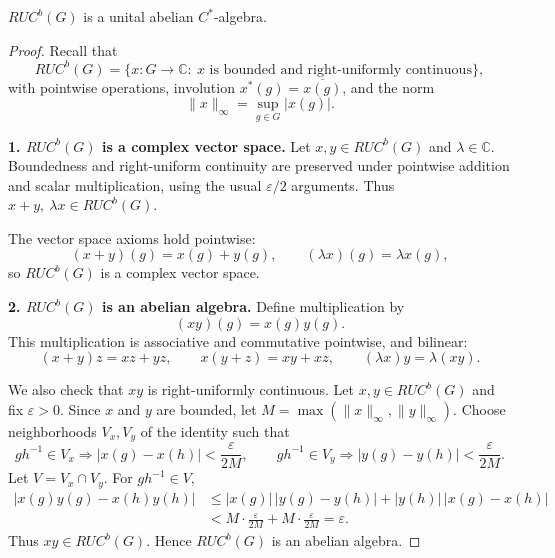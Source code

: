 \begin{mynote}
    \begin{proposition*}
        $RUC^b(G)$ is a unital abelian $C^*$-algebra.
    \end{proposition*}

    \begin{proof}
        Recall that
        \[
            RUC^b(G)=\{x:G\to\mathbb C:\ x \text{ is bounded and right-uniformly continuous}\},
        \]
        with pointwise operations, involution $x^*(g)=\overline{x(g)}$, and the norm
        \[
            \|x\|_\infty=\sup_{g\in G}|x(g)|.
        \]

        \medskip
        \noindent\textbf{1. $RUC^b(G)$ is a complex vector space.}
        Let $x,y\in RUC^b(G)$ and $\lambda\in\mathbb C$.
        Boundedness and right-uniform continuity are preserved under pointwise
        addition and scalar multiplication, using the usual $\varepsilon/2$ arguments.
        Thus $x+y,\ \lambda x\in RUC^b(G)$.

        The vector space axioms hold pointwise:
        \[
            (x+y)(g)=x(g)+y(g),\qquad (\lambda x)(g)=\lambda x(g),
        \]
        so $RUC^b(G)$ is a complex vector space.

        \medskip
        \noindent\textbf{2. $RUC^b(G)$ is an abelian algebra.}
        Define multiplication by
        \[
            (xy)(g)=x(g)y(g).
        \]
        This multiplication is associative and commutative pointwise, and bilinear:
        \[
            (x+y)z = xz + yz,\qquad x(y+z)=xy+xz,\qquad (\lambda x)y=\lambda(xy).
        \]

        We also check that $xy$ is right-uniformly continuous.
        Let $x,y\in RUC^b(G)$ and fix $\varepsilon>0$.
        Since $x$ and $y$ are bounded, let $M=\max(\|x\|_\infty,\|y\|_\infty)$.
        Choose neighborhoods $V_x,V_y$ of the identity such that
        \[
            gh^{-1}\in V_x\Rightarrow |x(g)-x(h)|<\frac{\varepsilon}{2M},\qquad
            gh^{-1}\in V_y\Rightarrow |y(g)-y(h)|<\frac{\varepsilon}{2M}.
        \]
        Let $V=V_x\cap V_y$.  For $gh^{-1}\in V$,
        \begin{align*}
            |x(g)y(g)-x(h)y(h)|
             & \le |x(g)|\,|y(g)-y(h)| + |y(h)|\,|x(g)-x(h)|                 \\
             & < M\cdot\frac{\varepsilon}{2M} + M\cdot\frac{\varepsilon}{2M}
            = \varepsilon.
        \end{align*}
        Thus $xy\in RUC^b(G)$.
        Hence $RUC^b(G)$ is an abelian algebra.


\end{proof}
\end{mynote}
